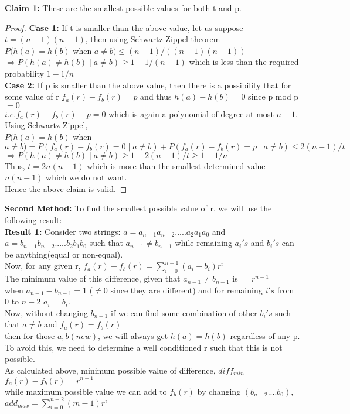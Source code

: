 \documentclass[11pt]{article}
\begin{document}
	\textbf{Claim 1:} These are the smallest possible values for both t and p. 
	\begin{proof}
		\textbf{Case 1:} If t is smaller than the above value, let us suppose $t = (n-1)(n-1)$, then using Schwartz-Zippel theorem \\
		$P(h(a) = h(b)$ when $a \neq b) \leq (n-1)/((n-1)(n-1))$ \\
		$\Rightarrow P(h(a) \neq h(b) \mid a \neq b) \geq 1 - 1/(n-1)$  which is less than the required probability $1 - 1/n$ \\
		\textbf{Case 2:} If p is smaller than the above value, then there is a possibility that for some value of r 
		$f_a(r) - f_b(r) = p$ and thus $h(a) - h(b) = 0$ since p mod p $= 0$\\
		$i.e. f_a(r) - f_b(r) - p = 0$ which is again a polynomial of degree at most $n-1$. Using Schwartz-Zippel, \\
		$P(h(a) = h(b)$ when $a \neq b) = P(f_a(r) - f_b(r) = 0 \mid a \neq b) + P(f_a(r) - f_b(r) = p \mid a \neq b) \leq 2(n-1)/t$
		$\Rightarrow P(h(a) \neq h(b) \mid a \neq b) \geq 1 - 2(n-1)/t \geq 1 - 1/n$ \\
		Thus, $t = 2n(n-1)$ which is more than  the smallest determined value $n(n-1)$ which we do not want. \\
		Hence the above claim is valid.
	\end{proof}
	
	\textbf{Second Method:}
	To find the smallest possible value of r, we will use the following result: \\
	
	\textbf{Result 1:} Consider two strings: $a = a_{n-1}a_{n-2}.....a_2a_1a_0$ and $a = b_{n-1}b_{n-2}.....b_2b_1b_0$ such that $a_{n-1} 
	\neq b_{n-1}$
	while  remaining $a_i's$ and $b_i's$ can be anything(equal or non-equal). \\
	Now, for any given r, $f_a(r) - f_b(r) =  \sum_{i=0}^{n-1} (a_i-b_i)r^i$ \\
	The minimum value of this difference, given that $a_{n-1} \neq b_{n-1}$ is $ = r^{n-1}$ \\
	when $a_{n-1} - b_{n-1} = 1$ ($\neq 0$ since they are different) and for remaining $i's$ from $0$ to $n-2$ $a_i$ = $b_i$. \\
	Now,  without changing $b_{n-1}$  if we can find some combination of other $b_i's$ such that $a \neq b$ and $f_a(r) = f_b(r)$ \\
	then for those $a, b(new)$, we will always get $h(a) = h(b)$ regardless of any p. \\
	To avoid this, we need to determine a well conditioned r such that this is not possible. \\
	As calculated above, minimum possible value of difference, $diff_{min}$ $f_a(r) - f_b(r) = r^{n-1}$ \\
	while maximum possible value we can add to $f_b(r)$ by changing $(b_{n-2}....b_0)$, $add_{max} = \sum_{i=0}^{n-2}(m-1)r^i$ \\
	
\end{document}
